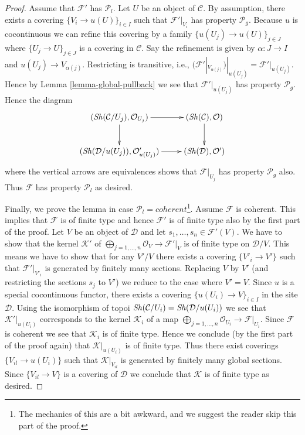 \begin{proof}
\medskip\noindent
Assume that $\mathcal{F}'$ has $\mathcal{P}_l$.
Let $U$ be an object of $\mathcal{C}$.
By assumption, there exists a covering
$\{V_i \to u(U)\}_{i \in I}$ such that $\mathcal{F}'|_{V_i}$
has property $\mathcal{P}_g$. Because $u$ is cocontinuous we
can refine this covering by a family $\{u(U_j) \to u(U)\}_{j \in J}$
where $\{U_j \to U\}_{j \in J}$ is a covering in $\mathcal{C}$.
Say the refinement is given by $\alpha : J \to I$ and
$u(U_j) \to V_{\alpha(j)}$.
Restricting is transitive, i.e.,
$(\mathcal{F}'|_{V_{\alpha(j)}})|_{u(U_j)} = \mathcal{F}'|_{u(U_j)}$.
Hence by Lemma \ref{lemma-global-pullback} we see that
$\mathcal{F}'|_{u(U_j)}$ has property $\mathcal{P}_g$.
Hence the diagram
$$
\xymatrix{
(\Sh(\mathcal{C}/U_j), \mathcal{O}_{U_j}) \ar[r] \ar[d] &
(\Sh(\mathcal{C}), \mathcal{O}) \ar[d] \\
(\Sh(\mathcal{D}/u(U_j)), \mathcal{O}'_{u(U_j)})
\ar[r] &
(\Sh(\mathcal{D}), \mathcal{O}')
}
$$
where the vertical arrows are equivalences shows that $\mathcal{F}|_{U_j}$
has property $\mathcal{P}_g$ also. Thus $\mathcal{F}$ has
property $\mathcal{P}_l$ as desired.

\medskip\noindent
Finally, we prove the lemma in case
$\mathcal{P}_l = coherent$\footnote{The mechanics of this
are a bit awkward, and we suggest the reader skip this part of the proof.}.
Assume $\mathcal{F}$ is coherent. This implies that $\mathcal{F}$
is of finite type and hence $\mathcal{F}'$ is of finite type also by the
first part of the proof. Let $V$ be an object of $\mathcal{D}$ and let
$s_1, \ldots, s_n \in \mathcal{F}'(V)$. We have to show that the kernel
$\mathcal{K}'$ of
$\bigoplus_{j = 1, \ldots, n} \mathcal{O}_V \to \mathcal{F}'|_V$
is of finite type on $\mathcal{D}/V$. This means we have to show that
for any $V'/V$ there exists a covering $\{V'_i \to V'\}$ such that
$\mathcal{F}'|_{V'_i}$ is generated by finitely many sections.
Replacing $V$ by $V'$ (and restricting the sections $s_j$ to $V'$)
we reduce to the case where $V' = V$. Since $u$ is a special
cocontinuous functor, there exists a covering $\{u(U_i) \to V\}_{i \in I}$
in the site $\mathcal{D}$. Using the isomorphism of topoi
$\mathop{\mathit{Sh}}\nolimits(\mathcal{C}/U_i) = \mathop{\mathit{Sh}}\nolimits(\mathcal{D}/u(U_i))$
we see that $\mathcal{K}'|_{u(U_i)}$ corresponds to the kernel
$\mathcal{K}_i$ of a map
$\bigoplus_{j = 1, \ldots, n} \mathcal{O}_{U_i} \to \mathcal{F}|_{U_i}$.
Since $\mathcal{F}$ is coherent we see that $\mathcal{K}_i$
is of finite type. Hence we conclude (by the first part of the proof again)
that $\mathcal{K}|_{u(U_i)}$ is of finite type. Thus there exist coverings
$\{V_{il} \to u(U_i)\}$ such that $\mathcal{K}|_{V_{il}}$ is generated
by finitely many global sections. Since
$\{V_{il} \to V\}$ is a covering of $\mathcal{D}$ we conclude that
$\mathcal{K}$ is of finite type as desired.


\end{proof}

